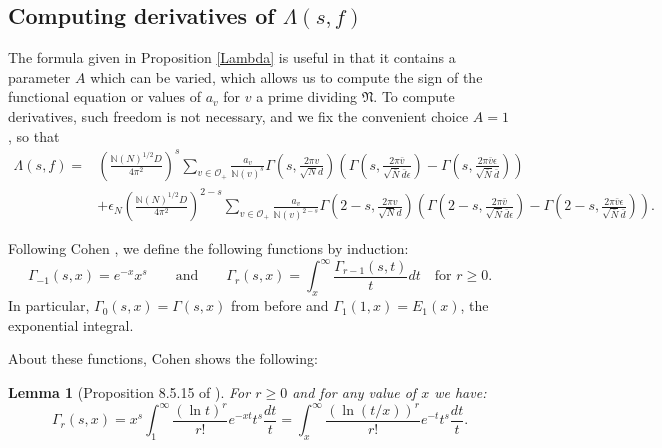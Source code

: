 \documentclass{article}
\theoremstyle{plain}
\newtheorem{lemma}{Lemma}
\begin{document}
\subsection{Computing derivatives of $\Lambda(s,f)$}

The formula given in Proposition \ref{Lambda} is useful in that it contains a parameter $A$ which can be varied, which allows us to compute the sign of the functional equation or values of $a_v$ for $v$ a prime dividing $\mathfrak{N}$. To compute derivatives, such freedom is not necessary, and we fix the convenient choice $A=1$, so that
\begin{equation*}
\begin{split}
\Lambda(s,f)=& \left(\frac{\mathbb{N}(N)^{1/2}D}{4\pi^2}\right)^s \sum_{v \in \mathcal{O}_+} \frac{a_v}{\mathbb{N}(v)^s} \Gamma\left(s, \frac{2\pi v }{\sqrt{N}d}\right) \left(\Gamma\left(s,\frac{2 \pi \bar{v}}{\sqrt{\bar{N}}\bar{d} \epsilon} \right)-  \Gamma\left(s,\frac{2 \pi \bar{v}\epsilon}{\sqrt{\bar{N}}\bar{d} } \right) \right) \\
&+ \epsilon_N \left(\frac{\mathbb{N}(N)^{1/2}D}{4\pi^2}\right)^{2-s}\sum_{v \in \mathcal{O}_+} \frac{a_v}{\mathbb{N}(v)^{2-s}} \Gamma\left(2-s, \frac{2\pi v }{\sqrt{N}d}\right) \left(\Gamma\left(2-s,\frac{2 \pi \bar{v}}{\sqrt{\bar{N}}\bar{d} \epsilon} \right)-  \Gamma\left(2-s,\frac{2 \pi \bar{v}\epsilon}{\sqrt{\bar{N}}\bar{d} } \right) \right).
\end{split}
\end{equation*}

Following Cohen \cite[Definition 8.5.12]{cohen}, we define the following functions by induction:
\begin{equation*}
\Gamma_{-1}(s,x)= e^{-x}x^s \qquad \text{and} \qquad \Gamma_r(s,x) = \int_x^{\infty}\frac{\Gamma_{r-1}(s,t)}{t}dt \quad \text{for } r\geq 0.
\end{equation*}
In particular, $\Gamma_0(s,x)=\Gamma(s,x)$ from before and $\Gamma_1(1,x)=E_1(x)$, the exponential integral.

About these functions, Cohen shows the following:
\begin{lemma}[Proposition 8.5.15 of \cite{cohen}]
For $r \geq 0$ and for any value of $x$ we have:
\begin{equation*}
\Gamma_r(s,x)=x^s \int_1^{\infty} \frac{(\ln t)^r}{r!}e^{-xt} t^s \frac{dt}{t}=\int_x^{\infty} \frac{(\ln(t/x))^r}{r!}e^{-t}t^s \frac{dt}{t}.
\end{equation*}
\end{lemma}
\end{document}
